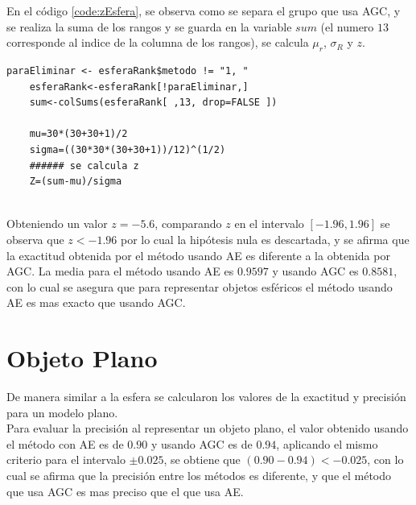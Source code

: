 En el código \ref{code:zEsfera}, se observa como se separa el grupo que usa AGC, y se realiza la suma de los rangos y se guarda en la variable $sum$ (el numero $13$ corresponde al indice de la columna de los rangos), se calcula $\mu_r$, $\sigma_R$ y $z$.\\

{\small 
	\label{code:zEsfera}
	\begin{lstlisting}[caption={Calculo de $z$.}]
	paraEliminar <- esferaRank$metodo != "1, "
	esferaRank<-esferaRank[!paraEliminar,]
	sum<-colSums(esferaRank[ ,13, drop=FALSE ])
	
	mu=30*(30+30+1)/2
	sigma=((30*30*(30+30+1))/12)^(1/2)
	###### se calcula z
	Z=(sum-mu)/sigma
	\end{lstlisting}
}$ $ \\

Obteniendo un valor $z=-5.6$, comparando $z$ en el intervalo $[-1.96,1.96]$ se observa que $z<-1.96$ por lo cual la hipótesis nula es descartada, y se afirma que la exactitud obtenida por el método usando AE es diferente a la obtenida por AGC. La media para el método usando AE es $0.9597$ y usando AGC es $0.8581$, con lo cual se asegura que para representar objetos esféricos el método usando AE es mas exacto que usando AGC.




%
%

 
 


\section{Objeto Plano}

De manera similar a la esfera se calcularon los valores de la exactitud y precisión para un modelo \gls{plano}.\\

Para evaluar la precisión al representar un objeto plano, el valor obtenido usando el método  con AE es de $0.90$ y usando AGC es de $0.94$, aplicando el mismo criterio para el intervalo $\pm 0.025$, se obtiene que $(0.90-0.94)<-0.025$, con lo cual se afirma que la precisión entre los métodos es diferente, y que el método que usa AGC es mas preciso que el que usa AE.\\

